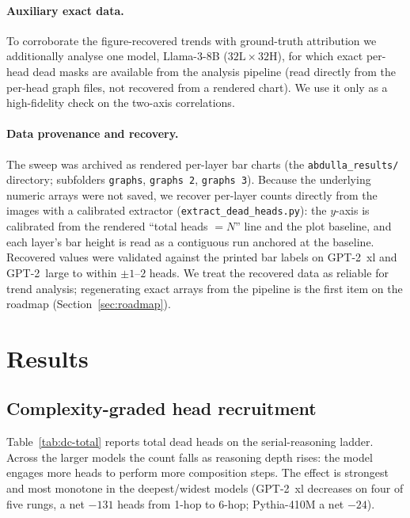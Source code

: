 \documentclass[11pt]{article}
\begin{document}
\paragraph{Auxiliary exact data.}
To corroborate the figure-recovered trends with ground-truth attribution we
additionally analyse one model, Llama-3-8B ($32\text{L}\times32\text{H}$), for
which exact per-head dead masks are available from the analysis pipeline (read
directly from the per-head graph files, not recovered from a rendered chart).
We use it only as a high-fidelity check on the two-axis correlations.

\paragraph{Data provenance and recovery.}
The sweep was archived as rendered per-layer bar charts (the
\texttt{abdulla\_results/} directory; subfolders \texttt{graphs},
\texttt{graphs~2}, \texttt{graphs~3}). Because the underlying numeric arrays
were not saved, we recover per-layer counts directly from the images with a
calibrated extractor (\texttt{extract\_dead\_heads.py}): the $y$-axis is
calibrated from the rendered ``total heads $=N$'' line and the plot baseline,
and each layer's bar height is read as a contiguous run anchored at the
baseline. Recovered values were validated against the printed bar labels on
GPT-2~xl and GPT-2~large to within $\pm1$--$2$ heads. We treat the recovered
data as reliable for trend analysis; regenerating exact arrays from the
pipeline is the first item on the roadmap (Section~\ref{sec:roadmap}).

\section{Results}

\subsection{Complexity-graded head recruitment}\label{sec:recruit}
Table~\ref{tab:dc-total} reports total dead heads on the serial-reasoning
ladder. Across the larger models the count falls as reasoning depth rises:
the model engages more heads to perform more composition steps. The effect is
strongest and most monotone in the deepest/widest models (GPT-2~xl decreases
on four of five rungs, a net $-131$ heads from 1-hop to 6-hop; Pythia-410M a
net $-24$).
\end{document}
